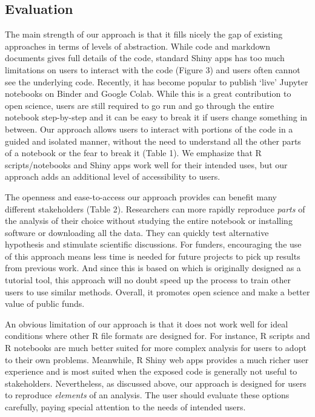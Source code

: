 \hypertarget{evaluation}{%
\subsection{Evaluation}\label{evaluation}}

The main strength of our approach is that it fills nicely the gap of
existing approaches in terms of levels of abstraction. While code and
markdown documents gives full details of the code, standard Shiny apps
has too much limitations on users to interact with the code (Figure 3)
and users often cannot see the underlying code. Recently, it has become
popular to publish `live' Jupyter notebooks on Binder and Google Colab.
While this is a great contribution to open science, users are still
required to go run and go through the entire notebook step-by-step and
it can be easy to break it if users change something in between. Our
approach allows users to interact with portions of the code in a guided
and isolated manner, without the need to understand all the other parts
of a notebook or the fear to break it (Table 1). We emphasize that R
scripts/notebooks and Shiny apps work well for their intended uses, but
our approach adds an additional level of accessibility to users.

The openness and ease-to-access our approach provides can benefit many
different stakeholders (Table 2). Researchers can more rapidly reproduce
\emph{parts} of the analysis of their choice without studying the entire
notebook or installing software or downloading all the data. They can
quickly test alternative hypothesis and stimulate scientific
discussions. For funders, encouraging the use of this approach means
less time is needed for future projects to pick up results from previous
work. And since this is based on  which is originally
designed as a tutorial tool, this approach will no doubt speed up the
process to train other users to use similar methods. Overall, it
promotes open science and make a better value of public funds.

An obvious limitation of our approach is that it does not work well for
ideal conditions where other R file formats are designed for. For
instance, R scripts and R notebooks are much better suited for more
complex analysis for users to adopt to their own problems. Meanwhile, R
Shiny web apps provides a much richer user experience and is most suited
when the exposed code is generally not useful to stakeholders.
Nevertheless, as discussed above, our approach is designed for users to
reproduce \emph{elements} of an analysis. The user should evaluate these
options carefully, paying special attention to the needs of intended
users.

